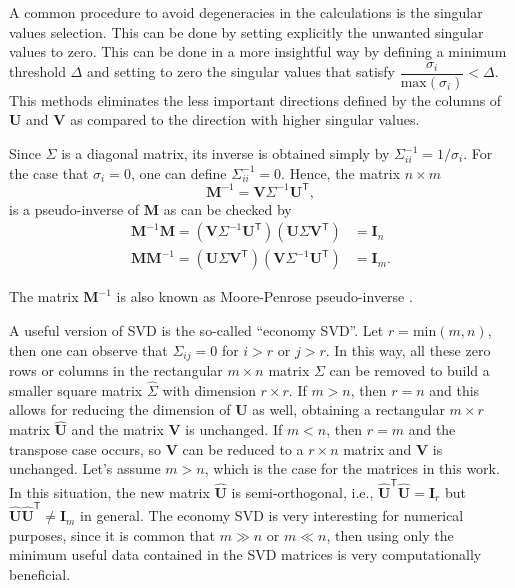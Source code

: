 A common procedure to avoid degeneracies in the calculations is the singular values selection. This can be done by setting explicitly the unwanted singular values to zero. This can be done in a more insightful way by defining a minimum threshold $\Delta$ and setting to zero the singular values that satisfy $\dfrac{\sigma_i}{\mathrm{max}\left(\sigma_i\right)} < \Delta$. This methods eliminates the less important directions defined by the columns of $\mathbf{U}$ and $\mathbf{V}$ as compared to the direction with higher singular values. 

Since $\Sigma$ is a diagonal matrix, its inverse is obtained simply by $\Sigma^{-1}_{ii} = 1/\sigma_{i}$. For the case that $\sigma_{i} = 0$, one can define $\Sigma^{-1}_{ii} = 0$. Hence, the matrix $n \times m$
\begin{equation}
    \mathbf{M}^{-1} = \mathbf{V} \Sigma^{-1} \mathbf{U}^{\mathsf{T}},
    \label{eq:svd_inverse}
\end{equation}
is a pseudo-inverse of $\mathbf{M}$ as can be checked by
\begin{align}
    \mathbf{M}^{-1}\mathbf{M} =  \left(\mathbf{V} \Sigma^{-1} \mathbf{U}^{\mathsf{T}} \right)\left(\mathbf{U} \Sigma \mathbf{V}^{\mathsf{T}}\right) &= \mathbf{I}_{n} \\
    \mathbf{M}\mathbf{M}^{-1} =  \left(\mathbf{U} \Sigma \mathbf{V}^{\mathsf{T}}\right)\left( \mathbf{V} \Sigma^{-1} \mathbf{U}^{\mathsf{T}} \right)&= \mathbf{I}_{m}. 
\end{align}

The matrix $\mathbf{M}^{-1}$ is also known as Moore-Penrose pseudo-inverse \cite{numerical_recipes}.

A useful version of SVD is the so-called ``economy SVD''. Let $r = \mathrm{min}\left(m, n\right)$, then one can observe that $\Sigma_{ij} = 0$ for $i > r$ or $j > r$. In this way, all these zero rows or columns in the rectangular $m \times n$ matrix $\Sigma$ can be removed to build a smaller square matrix $\hat{\Sigma}$ with dimension $r \times r$. If $m > n$, then $r = n$ and this allows for reducing the dimension of $\mathbf{U}$ as well, obtaining a rectangular $m \times r$ matrix $\hat{\mathbf{U}}$ and the matrix $\mathbf{V}$ is unchanged. If $m < n$, then $r=m$ and the transpose case occurs, so $\mathbf{V}$ can be reduced to a $r \times n$ matrix and $\mathbf{V}$ is unchanged. Let's assume $m > n$, which is the case for the matrices in this work. In this situation, the new matrix $\hat{\mathbf{U}}$ is semi-orthogonal, i.e., $\hat{\mathbf{U}}^{\mathsf{T}}\hat{\mathbf{U}} = \mathbf{I}_r$ but $\hat{\mathbf{U}}\hat{\mathbf{U}}^{\mathsf{T}} \neq \mathbf{I}_m$ in general. The economy SVD is very interesting for numerical purposes, since it is common that $m \gg n$ or $m \ll n$, then using only the minimum useful data contained in the SVD matrices is very computationally beneficial.

